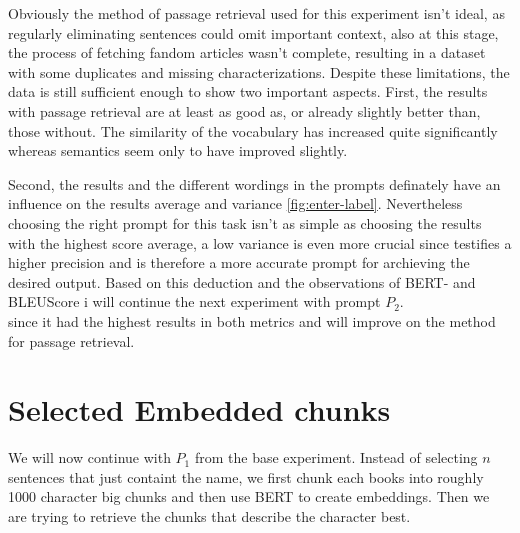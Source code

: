Obviously the method of passage retrieval used for this experiment isn't ideal, as regularly eliminating sentences could omit important context, also at this stage, the process of fetching fandom articles wasn't complete, resulting in a dataset with some duplicates and missing characterizations. Despite these limitations, the data is still sufficient enough to show two important aspects. First, the results with passage retrieval are at least as good as, or already slightly better than, those without. The similarity of the vocabulary has increased quite significantly whereas semantics seem only to have improved slightly.

Second, the results and the different wordings in the prompts definately have an influence on the results average and variance \ref*{fig:enter-label}. Nevertheless choosing the right prompt for this task isn't as simple as choosing the results with the highest score average, a low variance is even more crucial since testifies a higher precision and is therefore a more accurate prompt for archieving the desired output. Based on this deduction and the observations of BERT- and BLEUScore i will continue the next experiment with prompt $P_{2}$.\\since it had the highest results in both metrics and will improve on the method for passage retrieval.


\newpage
\section{Selected Embedded chunks}

We will now continue with $P_{1}$ from the base experiment. Instead of selecting $n$ sentences that just containt the name, we first chunk each books into roughly 1000 character big chunks and then use BERT to create embeddings. Then we are trying to retrieve the chunks that describe the character best.



